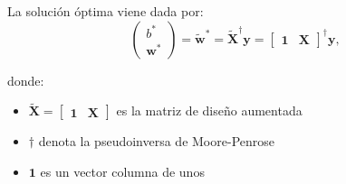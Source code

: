 La solución óptima viene dada por:
$$
\begin{pmatrix} b^* \\ \mathbf{w}^* \end{pmatrix} = 
\tilde{\mathbf{w}}^* = 
\tilde{\mathbf{X}}^{\dagger} \mathbf{y} = 
\begin{bmatrix} \mathbf{1} & \mathbf{X} \end{bmatrix}^{\dagger} \mathbf{y},
$$

donde:
\begin{itemize}
\item $\tilde{\mathbf{X}} = \begin{bmatrix} \mathbf{1} & \mathbf{X} \end{bmatrix}$ es la matriz de diseño aumentada
\item $\dagger$ denota la pseudoinversa de Moore-Penrose
\item $\mathbf{1}$ es un vector columna de unos
\end{itemize}

